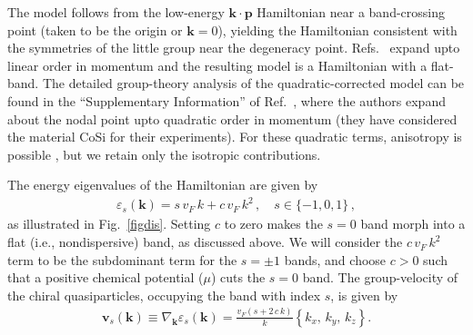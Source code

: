 \documentclass[aps,prb,onecolumn,nofootinbib,citeautoscript,10pt]{revtex4-2}
\begin{document}
The model follows from the low-energy $\boldsymbol k \cdot \boldsymbol p$ Hamiltonian near a band-crossing point (taken to be the origin or $ \boldsymbol k = 0$), yielding the Hamiltonian consistent with the symmetries of the little group near the degeneracy point. Refs.~\cite{bernevig, grushin-multifold} expand upto linear order in momentum and the resulting model is a Hamiltonian with a flat-band. The detailed group-theory analysis of the quadratic-corrected model can be found in the ``Supplementary Information'' of Ref.~\cite{ni2021_giant}, where the authors expand about the nodal point upto quadratic order in momentum (they have considered the material CoSi for their experiments). For these quadratic terms, anisotropy is possible \cite{ni2021_giant}, but we retain only the isotropic contributions.



The energy eigenvalues of the Hamiltonian are given by
 \begin{align} 
\label{eigenvalues}
\varepsilon_ s  ({ \boldsymbol k}) = 
 s \,v_F\,  k + c\, v_F \, k^2 \,, \quad
s \in \lbrace -1,0,1 \rbrace \,,
\end{align}
as illustrated in Fig.~\ref{figdis}.
Setting $c$ to zero makes the $s=0$ band morph into a flat (i.e., nondispersive) band, as discussed above. We will consider the $c\, v_F \, k^2$ term to be the subdominant term for the $s = \pm 1$ bands, and choose $c>0$ such that a positive chemical potential ($\mu$) cuts the $s=0$ band.
The group-velocity of the chiral quasiparticles, occupying the band with index $s$, is given by
\begin{align}
{\boldsymbol  v}_ s ( \boldsymbol k) 
\equiv \nabla_{\boldsymbol k} \varepsilon_ s   (\boldsymbol k)
=  \frac{ v_F \left( s + 2 \, c\, k \right) } {  k }  
\left \lbrace k_x,\,k_y, \, k_z \right \rbrace .
\end{align}
\end{document}
